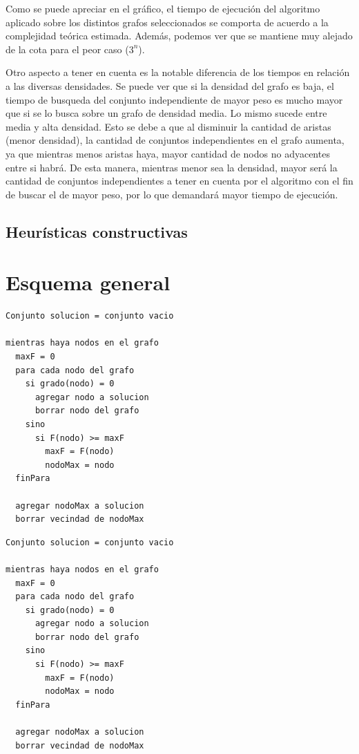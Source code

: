 \documentclass[a4paper,11pt] {article}
\begin{document}
Como se puede apreciar en el gr\'afico, el tiempo de ejecuci\'on del algoritmo aplicado sobre los distintos grafos seleccionados se comporta de acuerdo a la complejidad te\'orica estimada. Adem\'as, podemos ver que se mantiene muy alejado de la cota para el peor caso ($3^{n}$).

Otro aspecto a tener en cuenta es la notable diferencia de los tiempos en relaci\'on a las diversas densidades. Se puede ver que si la densidad del grafo es baja, el tiempo de busqueda del conjunto independiente de mayor peso es mucho mayor que si se lo busca sobre un grafo de densidad media. Lo mismo sucede entre media y alta densidad. Esto se debe a que al disminuir la cantidad de aristas (menor densidad), la cantidad de conjuntos independientes en el grafo aumenta, ya que mientras menos aristas haya, mayor cantidad de nodos no adyacentes entre si habr\'a. De esta manera, mientras menor sea la densidad, mayor ser\'a la cantidad de conjuntos independientes a tener en cuenta por el algoritmo con el fin de buscar el de mayor peso, por lo que demandar\'a mayor tiempo de ejecuci\'on.

\bigskip

\begin{center}
\section*{Heur\'isticas constructivas}
\end{center}

\bigskip
\section*{Esquema general}

\begin{verbatim}
Conjunto solucion = conjunto vacio

mientras haya nodos en el grafo
  maxF = 0
  para cada nodo del grafo
    si grado(nodo) = 0
      agregar nodo a solucion
      borrar nodo del grafo
    sino
      si F(nodo) >= maxF
        maxF = F(nodo)
        nodoMax = nodo
  finPara

  agregar nodoMax a solucion
  borrar vecindad de nodoMax
\end{verbatim}

\begin{verbatim}
Conjunto solucion = conjunto vacio

mientras haya nodos en el grafo
  maxF = 0
  para cada nodo del grafo
    si grado(nodo) = 0
      agregar nodo a solucion
      borrar nodo del grafo
    sino
      si F(nodo) >= maxF
        maxF = F(nodo)
        nodoMax = nodo
  finPara

  agregar nodoMax a solucion
  borrar vecindad de nodoMax
\end{verbatim}
\end{document}
